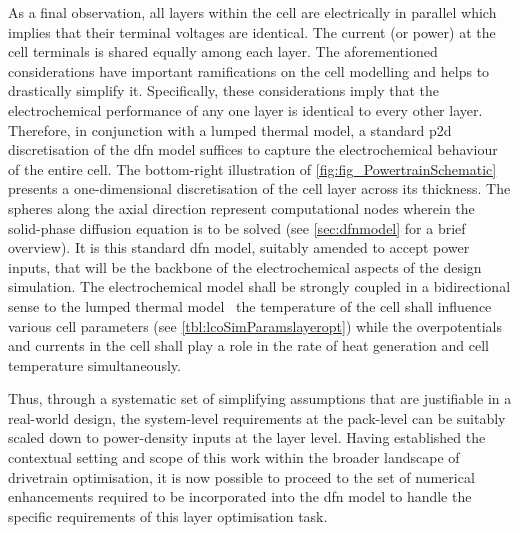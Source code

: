 As a final observation, all layers  within the cell are electrically in parallel
which implies that their terminal voltages are identical. The current (or power)
at the  cell terminals is  shared equally  among each layer.  The aforementioned
considerations have important  ramifications on the cell modelling  and helps to
drastically  simplify  it. Specifically,  these  considerations  imply that  the
electrochemical  performance  of any  one  layer  is  identical to  every  other
layer.  Therefore,  in conjunction  with  a  lumped  thermal model,  a  standard
\gls{p2d}  discretisation  of  the  \gls{dfn}  model  suffices  to  capture  the
electrochemical behaviour of  the entire cell. The  bottom-right illustration of
\cref{fig:fig_PowertrainSchematic} presents a  one-dimensional discretisation of
the  cell layer  across its  thickness. The  spheres along  the axial  direction
represent computational nodes  wherein the solid-phase diffusion  equation is to
be solved  (see \cref{sec:dfnmodel} for a  brief overview). It is  this standard
\gls{dfn}  model,  suitably  amended  to  accept  power  inputs,  that  will  be
the  backbone of  the  electrochemical  aspects of  the  design simulation.  The
electrochemical model shall be strongly coupled  in a bidirectional sense to the
lumped thermal model  \ie~the temperature of the cell  shall influence various
cell parameters  (see \cref{tbl:lcoSimParamslayeropt}) while  the overpotentials
and currents in  the cell shall play a  role in the rate of  heat generation and
cell temperature simultaneously.

Thus, through a  systematic set of simplifying assumptions  that are justifiable
in a real-world  design, the system-level requirements at the  pack-level can be
suitably  scaled  down  to  power-density  inputs at  the  layer  level.  Having
established the  contextual setting and  scope of  this work within  the broader
landscape of drivetrain  optimisation, it is now possible to  proceed to the set
of numerical enhancements  required to be incorporated into  the \gls{dfn} model
to handle the specific requirements of this layer optimisation task.

